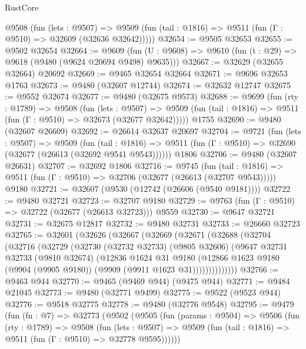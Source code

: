 \begin{lexlean}{RustCore}
\begin{coremodule}
    @9508
      (fun (lets : @9507) =>
      @9509 (fun (tail : @1816) => @9511 (fun (Γ : @9510) => @32609 (@32636 @32642)))))
@32654 := @9505 @32653
@32655 := @9502 @32654
@32664 := @9609
    (fun (U : @9608) => @9610 (fun (t : @29) => @9618 (@9480 (@9624 @20694 @9498) @9635)))
@32667 := @32629 (@32655 @32664) @20692
@32669 := @9465 @32654 @32664
@32671 := @9696 @32653 @1763
@32673 := @9480 (@32607 @12744)
@32674 := @32632 @12747
@32675 := @9552 @32674
@32677 := @9480 (@32675 @9573)
@32688 := @9699
    (fun (rty : @1789) =>
    @9508
      (fun (lets : @9507) =>
      @9509 (fun (tail : @1816) => @9511 (fun (Γ : @9510) => @32673 (@32677 @32642)))))
    @1755
@32690 := @9480 (@32607 @26609)
@32692 := @26614 @32637 @20697
@32704 := @9721
    (fun (lets : @9507) =>
    @9509
      (fun (tail : @1816) =>
      @9511 (fun (Γ : @9510) => @32690 (@32677 (@26613 (@32692 @9541 @9543))))))
    @1806
@32706 := @9480 (@32607 @26631)
@32707 := @32692 @1806
@32716 := @9745
    (fun (tail : @1816) => @9511 (fun (Γ : @9510) => @32706 (@32677 (@26613 (@32707 @9543)))))
    @9180
@32721 := @32607 (@9530 (@12742 (@26606 (@9540 @9181))))
@32722 := @9480 @32721
@32723 := @32707 @9180
@32729 := @9763 (fun (Γ : @9510) => @32722 (@32677 (@26613 @32723))) @9559
@32730 := @9647 @32721
@32731 := @32675 @12817
@32732 := @9480 @32731
@32733 := @26660 @32723
@32765 := @32601
    (@32626
      (@32667
        (@32669
          (@32671
            (@32688
              (@32704
                (@32716
                  (@32729
                    (@32730
                      (@32732 @32733)
                      (@9805 @32606)
                      (@9647
                        @32731
                        @32733
                        (@9810 @32674)
                        (@12836
                          @1624
                          @31
                          @9180
                          (@12866
                            @1623
                            @9180
                            (@9904 (@9905 @9180))
                            (@9909 (@9911 @1623 @31))))))))))))))
@32766 := @9463 @944
@32770 := @9465 (@9469 @944) (@9475 @944)
@32771 := @9484 @21045
@32773 := @9480 (@32771 @9499)
@32775 := @9522 (@9523 @944)
@32776 := @9518 @32775
@32778 := @9480 (@32776 @9548)
@32795 := @9479
    (fun (fn : @7) =>
    @32773
      (@9502
        (@9505
          (fun (params : @9504) =>
          @9506
            (fun (rty : @1789) =>
            @9508
              (fun (lets : @9507) =>
              @9509 (fun (tail : @1816) => @9511 (fun (Γ : @9510) => @32778 @9595))))))

\end{coremodule}
\end{lexlean}
